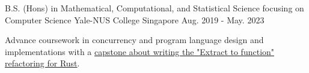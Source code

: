 

\begin{cventries}

  \cventry
    {B.S. (Hons) in Mathematical, Computational, and Statistical Science focusing on Computer Science} %
    {Yale-NUS College} %
    {Singapore} %
    {Aug. 2019 - May. 2023} %
    {
      \begin{cvitems} %
        \item {Advance coursework in concurrency and program language design and implementations with a \href{https://www.google.com}{capstone about writing the "Extract to function" refactoring for Rust}.}  
      \end{cvitems}
    }

\end{cventries}
